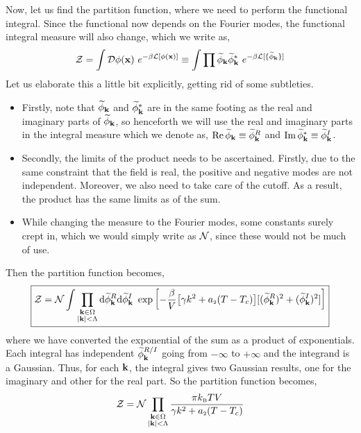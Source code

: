 Now, let us find the partition function, where we need to perform the functional integral. Since the functional now depends on the Fourier modes, the functional integral measure will also change, which we write as, 
\begin{align*}
    \SZ = \int \SD \phi(\vb{x})\ e^{-\beta \SL[\phi(\vb{x})]} \equiv \int \prod \widetilde{\phi}_{\vb{k}}\widetilde{\phi}^*_{\vb{k}}\ e^{-\beta \SL[\{\widetilde{\phi}_{\vb{k}}\}]}
\end{align*}
Let us elaborate this a little bit explicitly, getting rid of some subtleties.
\begin{itemize}
    \item Firstly, note that $\widetilde{\phi}_{\vb{k}}$ and $\widetilde{\phi}^*_{\vb{k}}$ are in the same footing as the real and imaginary parts of $\widetilde{\phi}_{\vb{k}}$, so henceforth we will use the real and imaginary parts in the integral measure which we denote as, $\Re \widetilde{\phi}_{\vb{k}}\equiv \widetilde{\phi}_{\vb{k}}^{R}$ and $\Im \widetilde{\phi}^*_{\vb{k}}\equiv \widetilde{\phi}_{\vb{k}}^{I}$.
    \item Secondly, the limits of the product needs to be ascertained. Firstly, due to the same constraint that the field is real, the positive and negative modes are not independent. Moreover, we also need to take care of the cutoff. As a result, the product has the same limits as of the sum. 
    \item While changing the measure to the Fourier modes, some constants surely crept in, which we would simply write as $\mathcal N$, since these would not be much of use. 
\end{itemize}
Then the partition function becomes, 
\begin{equation}
    \boxed{\mathcal Z = \mathcal N \int   \prod\limits_{\substack{\vb{k}\in \Omega\\ \abs{\vb{k}}<\Lambda}} \dd\widetilde{\phi}_{\vb{k}}^R\dd\widetilde{\phi}^I_{\vb{k}}\ \exp \qty[-\frac{\beta}{V}\qty[\gamma k^2 + a_{\text{\tiny 2}}(T-T_c)][(\widetilde{\phi}^R_{\vb{k}})^2+(\widetilde{\phi}^I_{\vb{k}})^2]]}
\end{equation}
where we have converted the exponential of the sum as a product of exponentials. Each integral has independent $\widetilde{\phi}_{\vb{k}}^{R/I}$ going from $-\infty$ to $+\infty$ and the integrand is a Gaussian. Thus, for each $\vb{k}$, the integral gives two Gaussian results, one for the imaginary and other for the real part. So the partition function becomes, 
\begin{equation}
    \mathcal Z = \mathcal N \prod\limits_{\substack{\vb{k}\in \Omega\\ \abs{\vb{k}}<\Lambda}} \frac{\pi k_{\text{\tiny B}} T V}{\gamma k^2+a_{\text{\tiny 2}}(T-T_c)}
\end{equation}

